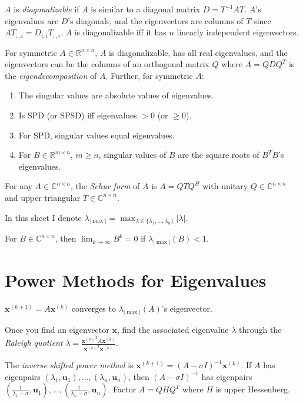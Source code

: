 \documentclass[landscape,10pt,letterpaper]{article}
\newcommand{\heading}[1]{\vspace{-1.5em} \section*{#1} \vspace{-1.0em}}
\newcommand{\maxeigenvalue}{\lambda_{| \max |}}
\begin{document}
\begin{multicols}{4}
$A$ is \emph{diagonalizable} if $A$ is similar to a diagonal matrix $D = T^{-1} A T$.  $A$'s eigenvalues are $D$'s diagonals, and the eigenvectors are columns of $T$ since $A T_{:,i} = D_{i,i} T_{:,i}$.  $A$ is diagonalizable iff it has $n$ linearly independent eigenvectors.

For symmetric $A \in \mathbb{R}^{n \times n}$, $A$ is diagonalizable, has all real eigenvalues, and the eigenvectors can be the columns of an orthogonal matrix $Q$ where $A = QDQ^T$ is the \emph{eigendecomposition} of $A$.  Further, for symmetric $A$:
\begin{enumerate}[topsep=0pt, partopsep=0pt, itemsep=-4pt]
\item The singular values are absolute values of eigenvalues.
\item Is SPD (or SPSD) iff eigenvalues $>0$ (or $\geq 0$).
\item For SPD, singular values equal eigenvalues.
\item For $B \in \mathbb{R}^{m \times n}$, $m \geq n$, singular values of $B$ are the square roots of $B^T B$'s eigenvalues.
\end{enumerate}

For any $A \in \mathbb{C}^{n \times n}$, the \emph{Schur form} of $A$ is $A = QTQ^H$ with unitary $Q \in \mathbb{C}^{n \times n}$ and upper triangular $T \in \mathbb{C}^{n \times n}$.

In this sheet I denote $\maxeigenvalue = \max_{\lambda \in \{ \lambda_1, \ldots, \lambda_n \} } | \lambda |$.

For $B \in \mathbb{C}^{n \times n}$, then $\lim_{k\to\infty}B^k = 0$ if $\maxeigenvalue(B) < 1$.

\heading{Power Methods for Eigenvalues}

$\mathbf{x}^{(k+1)} = A \mathbf{x}^{(k)}$ converges to $\maxeigenvalue(A)$'s eigenvector.

Once you find an eigenvector $\mathbf{x}$, find the associated eigenvalue $\lambda$ through the \emph{Raleigh quotient} $\lambda = \frac{{\mathbf{x}^{(k)}}^T A \mathbf{x}^{(k)}}{{\mathbf{x}^{(k)}}^T \mathbf{x}^{(k)}}$.

The \emph{inverse shifted power method} is $\mathbf{x}^{(k+1)} = (A - \sigma I)^{-1} \mathbf{x}^{(k)}$.  If $A$ has eigenpairs $(\lambda_1, \mathbf{u}_1), \ldots, (\lambda_n, \mathbf{u}_n)$, then $(A - \sigma I)^{-1}$ has eigenpairs $\left( \frac{1}{\lambda_1 - \sigma}, \mathbf{u}_1 \right), \ldots, \left( \frac{1}{\lambda_n - \sigma}, \mathbf{u}_n \right)$.  Factor $A = QHQ^T$ where $H$ is upper Hessenberg.


\end{multicols}
\end{document}
